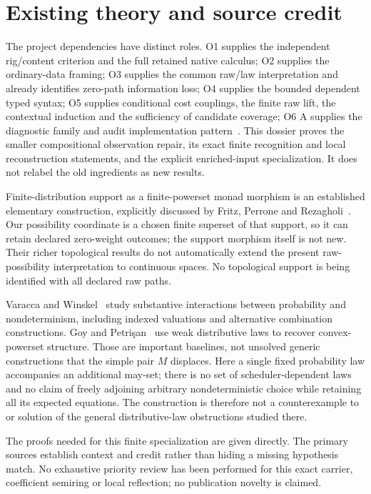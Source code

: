 \documentclass[11pt,a4paper]{article}
\theoremstyle{definition}
\begin{document}
\section{Existing theory and source credit}\label{sec:sources}
The project dependencies have distinct roles. O1 supplies the independent
rig/content criterion and the full retained native calculus; O2 supplies
the ordinary-data framing; O3 supplies the common raw/law interpretation
and already identifies zero-path information loss; O4 supplies the
bounded dependent typed syntax; O5 supplies conditional cost couplings,
the finite raw lift, the contextual induction and the sufficiency of
candidate coverage; O6 A supplies the diagnostic family and audit
implementation pattern~\cite{O1,O2,O3,O4,O5,O6}. This dossier proves the
smaller compositional observation repair, its exact finite recognition
and local reconstruction statements, and the explicit enriched-input
specialization. It does not relabel the old ingredients as new results.

Finite-distribution support as a finite-powerset monad morphism is an
established elementary construction, explicitly discussed by Fritz,
Perrone and Rezagholi~\cite{FPR}. Our possibility coordinate is a chosen
finite superset of that support, so it can retain declared zero-weight
outcomes; the support morphism itself is not new. Their richer
topological results do not automatically extend the present raw-possibility
interpretation to continuous spaces. No topological support is being
identified with all declared raw paths.

Varacca and Winskel~\cite{VW} study substantive interactions between
probability and nondeterminism, including indexed valuations and
alternative combination constructions. Goy and Petri\c{s}an~\cite{GP}
use weak distributive laws to recover convex-powerset structure. Those
are important baselines, not unsolved generic constructions that the
simple pair $M$ displaces. Here a single fixed probability law accompanies
an additional may-set; there is no set of scheduler-dependent laws and
no claim of freely adjoining arbitrary nondeterministic choice while
retaining all its expected equations. The construction is therefore not
a counterexample to or solution of the general distributive-law
obstructions studied there.

The proofs needed for this finite specialization are given directly.
The primary sources establish context and credit rather than hiding a
missing hypothesis match. No exhaustive priority review has been
performed for this exact carrier, coefficient semiring or local
reflection; no publication novelty is claimed.
\end{document}
